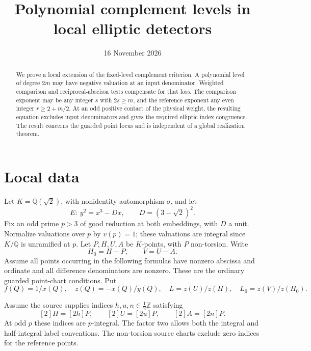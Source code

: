 \documentclass[11pt,a4paper]{article}
\title{Polynomial complement levels in local elliptic detectors}
\author{}\date{16 November 2026}
\newcommand{\Q}{\mathbb Q}\newcommand{\Z}{\mathbb Z}
\begin{document}
\maketitle
\begin{abstract}
We prove a local extension of the fixed-level complement criterion.
A polynomial level of degree $2m$ may have negative valuation at an
input denominator. Weighted comparison and reciprocal-abscissa tests
compensate for that loss. The comparison exponent may be any integer
$s$ with $2s\ge m$, and the reference exponent any even integer
$r\ge2+m/2$. At an odd positive contact of the physical weight,
the resulting equation excludes input denominators and gives the
required elliptic index congruence. The result concerns the guarded
point locus and is independent of a global realization theorem.
\end{abstract}

\section{Local data}

Let $K=\Q(\sqrt2)$, with nonidentity automorphism $\sigma$, and let
\[
             E:\ y^2=x^3-Dx,\qquad D=(3-\sqrt2)^2.
\]
Fix an odd prime $p>3$ of good reduction at both embeddings, with
$D$ a unit. Normalize valuations over $p$ by $v(p)=1$; these valuations
are integral since $K/\Q$ is unramified at $p$.
Let $P,H,U,A$ be $K$-points, with $P$ non-torsion. Write
\[
                  H_0=H-P,\qquad V=U-A.
\]
Assume all points occurring in the following formulas have nonzero
abscissa and ordinate and all difference denominators are nonzero.
These are the ordinary guarded point-chart conditions.
Put
\[
 f(Q)=1/x(Q),\quad z(Q)=-x(Q)/y(Q),\quad
 L=z(U)/z(H),\quad L_0=z(V)/z(H_0).
\]

Assume the source supplies indices $h,u,n\in\frac12\Z$ satisfying
\begin{equation}\label{eq:indices}
 [2]H=[2h]P,\qquad [2]U=[2u]P,\qquad [2]A=[2n]P.
\end{equation}
At odd $p$ these indices are $p$-integral. The factor two allows both
the integral and half-integral label conventions. The non-torsion
source charts exclude zero indices for the reference points.
\end{document}
